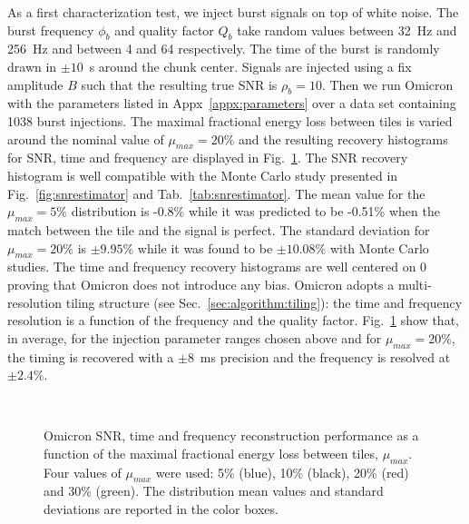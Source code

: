 As a first characterization test, we inject burst signals on top of white noise. The burst frequency $\phi_b$ and quality factor $Q_b$ take random values between 32~Hz and 256~Hz and between 4 and 64 respectively. The time of the burst is randomly drawn in $\pm10$~s around the chunk center. Signals are injected using a fix amplitude $B$ such that the resulting true SNR is $\rho_b=10$. Then we run Omicron with the parameters listed in Appx~\ref{appx:parameters} over a data set containing 1038 burst injections. The maximal fractional energy loss between tiles is varied around the nominal value of $\mu_{max}=20\%$ and the resulting recovery histograms for SNR, time and frequency are displayed in Fig.~\ref{fig:char_mismatch}. The SNR recovery histogram is well compatible with the Monte Carlo study presented in Fig.~\ref{fig:snrestimator} and Tab.~\ref{tab:snrestimator}. The mean value for the $\mu_{max}=5\%$ distribution is -0.8\% while it was predicted to be -0.51\% when the match between the tile and the signal is perfect. The standard deviation for $\mu_{max}=20\%$ is $\pm9.95\%$ while it was found to be $\pm10.08\%$ with Monte Carlo studies. The time and frequency recovery histograms are well centered on 0 proving that Omicron does not introduce any bias. Omicron adopts a multi-resolution tiling structure (see Sec.~\ref{sec:algorithm:tiling}): the time and frequency resolution is a function of the frequency and the quality factor. Fig.~\ref{fig:char_mismatch} show that, in average, for the injection parameter ranges chosen above and for $\mu_{max}=20\%$, the timing is recovered with a $\pm8$~ms precision and the frequency is resolved at $\pm2.4\%$. 
\begin{figure}
  \center
   \\
  \caption{Omicron SNR, time and frequency reconstruction performance as a function of the maximal fractional energy loss between tiles, $\mu_{max}$. Four values of $\mu_{max}$ were used: 5\% (blue), 10\% (black), 20\% (red) and 30\% (green). The distribution mean values and standard deviations are reported in the color boxes.}
  \label{fig:char_mismatch}
\end{figure}

